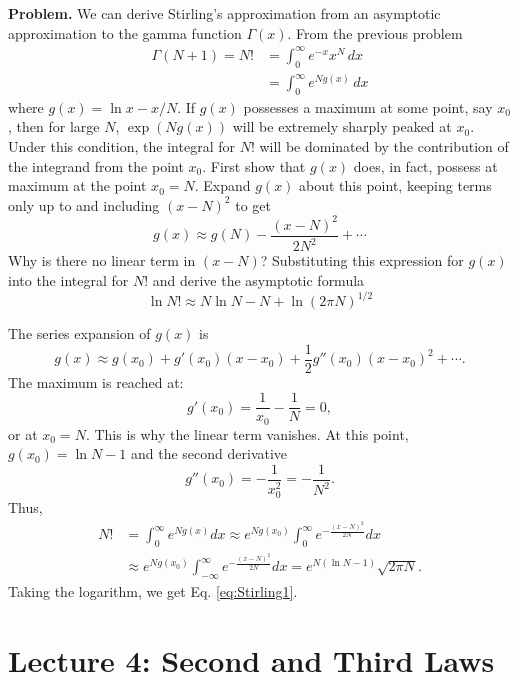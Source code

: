 \documentclass[twocolumn, 10pt]{article}
\numberwithin{equation}{section}
\newenvironment{problem}
{\par\medskip \color{problue}
  \textbf{Problem. }\ignorespaces}
{\medskip}
\newenvironment{solution}[1][\empty]
{\par\medskip\sffamily
  \textbf{\ifx\empty#1{Solution.}\relax\else{#1}\fi} \ignorespaces}
{\medskip}
\begin{document}
\begin{problem}
We can derive Stirling's approximation from
an asymptotic approximation to the gamma function $\Gamma(x)$.
From the previous problem
\begin{align*}
  \Gamma(N+1) = N!
  &= \int_0^\infty e^{-x} x^N \, dx
  \\
  &= \int_0^\infty e^{N g(x)} \, dx
\end{align*}
where $g(x) = \ln x - x/N$.
%
If $g(x)$ possesses a maximum at some point, say $x_0$,
then for large $N$, $\exp(N g(x))$ will be extremely
sharply peaked at $x_0$.
%
Under this condition, the integral for $N!$
will be dominated by the contribution of the integrand
from the point $x_0$.
%
First show that $g(x)$ does, in fact,
possess at maximum at the point $x_0 = N$.
%
Expand $g(x)$ about this point,
keeping terms only up to and including
$(x-N)^2$ to get
$$
g(x) \approx g(N) - \frac{ (x - N)^2 } { 2 N^2 } + \cdots
$$
Why is there no linear term in $(x-N)$?
Substituting this expression for $g(x)$
into the integral for $N!$ and derive the asymptotic formula
\begin{equation}
  \ln N! \approx N \ln N - N + \ln (2\pi N)^{1/2}
  \label{eq:Stirling1}
\end{equation}
\end{problem}

\begin{solution}
The series expansion of $g(x)$ is
$$
  g(x) \approx g(x_0)
  + g'(x_0) (x - x_0)
  + \frac{1}{2} g''(x_0) (x - x_0)^2
  + \cdots.
$$
The maximum is reached at:
$$
  g'(x_0) = \frac{1}{x_0} - \frac{1}{N} = 0,
$$
or at $x_0 = N$.
This is why the linear term vanishes.
%
At this point, $g(x_0) = \ln N - 1$
and the second derivative
$$
  g''(x_0) = -\frac{1}{x_0^2} = -\frac{1}{N^2}.
$$
%
Thus,
\begin{align*}
  N!
  &= \int_0^\infty e^{Ng(x)} dx
  \approx
  e^{Ng(x_0)}
  \int_0^\infty
  e^{- \frac{(x-N)^2}{2N} } dx
  \\
  &\approx
  e^{Ng(x_0)}
  \int_{-\infty}^\infty
  e^{- \frac{(x-N)^2}{2N} } dx
  =
  e^{N(\ln N - 1)} \sqrt{2\pi N}
  .
\end{align*}
%
Taking the logarithm, we get Eq. \eqref{eq:Stirling1}.
\end{solution}

\section{Lecture 4: Second and Third Laws}
\end{document}
